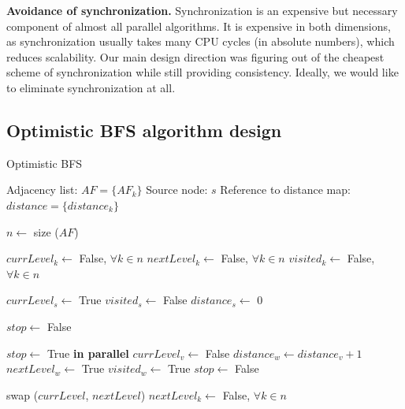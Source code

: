 \documentclass[letterpaper]{article}
\begin{document}
			\textbf{Avoidance of synchronization.}
			Synchronization is an expensive but necessary component of almost all parallel algorithms.
			It is expensive in both dimensions, as synchronization usually takes many CPU cycles (in absolute numbers), which reduces scalability. 	%
			Our main design direction was figuring out of the cheapest scheme of synchronization while still providing consistency.
			Ideally, we would like to eliminate synchronization at all.
			
			
		\subsection{Optimistic BFS algorithm design}
		
			\begin{algorithm}[h]
				\caption{Optimistic BFS}
				\label{alg:optbfs}
				\begin{algorithmic}[1]
					\Require
						\Statex Adjacency list: $AF = \lbrace AF_k \rbrace$
						\Statex Source node: $s$
						\Statex Reference to distance map: $distance = \lbrace distance_k \rbrace$
					\Statex

					\State $n \gets$ size ($AF$) 					
					
					\State $currLevel_k \gets$ False, $\forall k \in n$
					\State $nextLevel_k \gets$ False, $\forall k \in n$
					\State $visited_k \gets$ False, $\forall k \in n$
					\Statex
					
					\State $currLevel_s \gets$ True
					\State $visited_s \gets$ False
					\State $distance_s \gets$ 0
					\Statex
					
					\State $stop \gets$ False
					\Statex
					
						\State $stop\gets$ True
						 \textbf{in parallel}
								\State $currLevel_v \gets$ False
										\State $distance_w \gets distance_v + 1$
										\State $nextLevel_w \gets$ True
										\State $visited_w \gets$ True
										\State $stop \gets$ False
									\EndIf
								\EndFor
							\EndIf
						\EndFor
						
						\vspace{-0.051cm} %
						
						\State swap ($currLevel$, $nextLevel$)
						\State $nextLevel_k \gets$ False, $\forall k\in n$
					\EndWhile
				\end{algorithmic}
			\end{algorithm}
\end{document}
